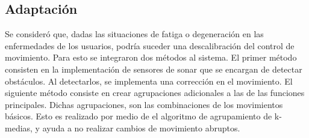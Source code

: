 \subsection*{Adaptación}

Se consideró que, dadas las situaciones de fatiga o degeneración en las enfermedades de los usuarios, podría suceder una descalibración del control de movimiento. Para esto se integraron dos métodos al sistema. El primer método consisten en la implementación de sensores de sonar que se encargan de detectar obstáculos. Al detectarlos, se implementa una corrección en el movimiento. El siguiente método consiste en crear agrupaciones adicionales a las de las funciones principales. Dichas agrupaciones, son las combinaciones de los movimientos básicos. Esto es realizado por medio de el algoritmo de agrupamiento de k-medias, y ayuda a no realizar cambios de movimiento abruptos. \cite{LuisA2013} 


